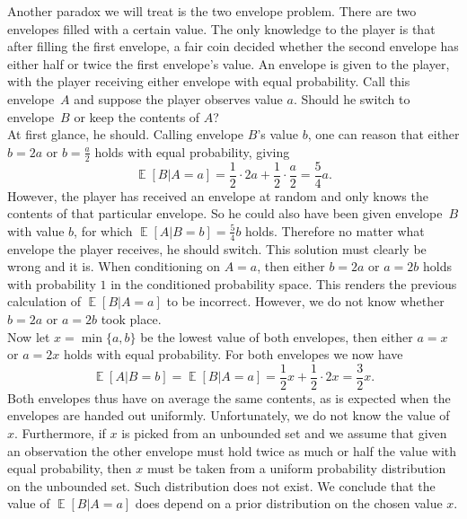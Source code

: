 \documentclass[a4paper]{report}
\theoremstyle{plain}
\theoremstyle{definition}
\theoremstyle{remark}
\numberwithin{equation}{chapter}
\DeclareMathOperator{\E}{\mathbb{E}}
\DeclareMathOperator{\1}{\mathbbm{1}}
\begin{document}
Another paradox we will treat is the two envelope problem. There are two envelopes filled with a certain value. The only knowledge to the player is that after filling the first envelope, a fair coin decided whether the second envelope has either half or twice the first envelope's value. An envelope is given to the player, with the player receiving either envelope with equal probability. Call this envelope~$A$ and suppose the player observes value $a$. Should he switch to envelope~$B$ or keep the contents of $A$?\\
At first glance, he should. Calling envelope $B$'s value $b$, one can reason that either $b=2a$ or $b=\frac{a}{2}$ holds with equal probability, giving \[\E[B|A=a]=\frac{1}{2}\cdot2a+\frac{1}{2}\cdot\frac{a}{2}=\frac{5}{4}a.\]
However, the player has received an envelope at random and only knows the contents of that particular envelope. So he could also have been given envelope~$B$ with value $b$, for which $\E[A|B=b]=\frac{5}{4}b$ holds. Therefore no matter what envelope the player receives, he should switch. This solution must clearly be wrong and it is. When conditioning on $A=a$, then either $b=2a$ or $a=2b$ holds with probability $1$ in the conditioned probability space. This renders the previous calculation of $\E[B|A=a]$ to be incorrect. However, we do not know whether $b=2a$ or $a=2b$ took place.\\
Now let $x=\min\{a,b\}$ be the lowest value of both envelopes, then either $a=x$ or $a=2x$ holds with equal probability. For both envelopes we now have
\[
\E[A|B=b]=\E[B|A=a]=\frac{1}{2}x+\frac{1}{2}\cdot2x=\frac{3}{2}x.
\]
Both envelopes thus have on average the same contents, as is expected when the envelopes are handed out uniformly. Unfortunately, we do not know the value of $x$. Furthermore, if $x$ is picked from an unbounded set and we assume that given an observation the other envelope must hold twice as much or half the value with equal probability, then $x$ must be taken from a uniform probability distribution on the unbounded set. Such distribution does not exist. We conclude that the value of $\E[B|A=a]$ does depend on a prior distribution on the chosen value $x$.\\
\end{document}
